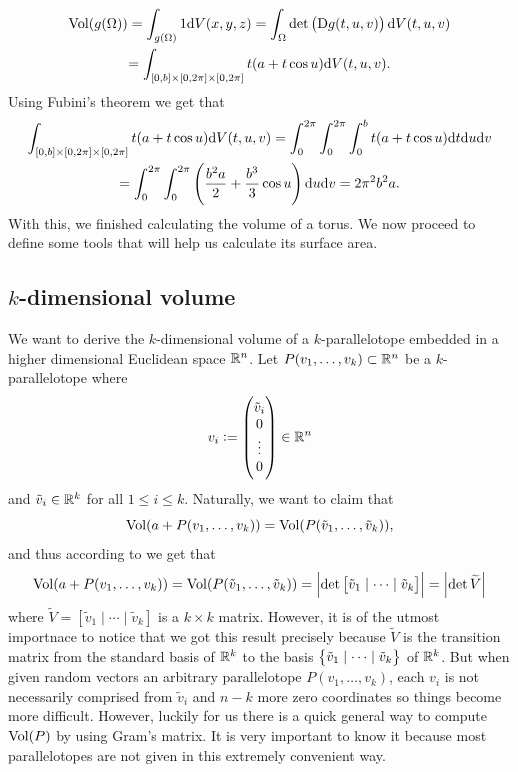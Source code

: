 \documentclass[11pt,a4paper]{article}
\begin{document}
\begin{example}
\begin{multline*}
    \Vol(g(\Omega)) =
    \int_{g(\Omega)} 1 \dV(x,y,z) =
    \int_{\Omega} \det\del{\Dif g(t,u,v)} \dV(t,u,v) \\ =
    \int_{[0,b] \times [0,2\pi] \times [0,2\pi]}
    t (a + t \cos u) \dV(t,u,v).
  \end{multline*}
  Using Fubini's theorem we get that
  \begin{multline*}
    \int_{[0,b] \times [0,2\pi] \times [0,2\pi]}
    t (a + t \cos u) \dV(t,u,v) =
    \int_{0}^{2\pi} \int_{0}^{2\pi} \int_{0}^{b}
    t (a + t \cos u) \dt\du\dv \\ =
    \int_{0}^{2\pi} \int_{0}^{2\pi}
    \del{\frac{b^2 a}{2} + \frac{b^3}{3} \cos u} \du\dv =
    2\pi^2 b^2 a.
  \end{multline*}
  With this, we finished calculating the volume of a torus.
  We now proceed to define some tools that will help us calculate its
  surface area.
\end{example}

\subsection{\texorpdfstring{$k$}{k}-dimensional volume}

\begin{remark}
  \label{rmk:volume-of-par}
  We want to derive the $k$-dimensional volume of a
  $k$-parallelotope embedded in a higher dimensional Euclidean space $\mathbb{R}^n$.
  Let $P(v_1,\dots,v_k) \subset \mathbb{R}^n$ be a $k$-parallelotope where
  \[
    v_i :=
    \begin{pmatrix} \tilde v_i \\ 0 \\ \vdots \\ 0 \end{pmatrix} \in \mathbb{R}^n
  \]
  and $\tilde v_i \in \mathbb{R}^k$ for all $1 \le i \le k$.
  Naturally, we want to claim that
  \[
    \operatorname{Vol}(a + P(v_1,\dots,v_k)) =
    \operatorname{Vol}(P(\tilde v_1,\dots,\tilde v_k)),
  \]
  and thus according to  we get that
  \[
    \operatorname{Vol}(a + P(v_1,\dots,v_k)) =
    \operatorname{Vol}(P(\tilde v_1,\dots,\tilde v_k)) =
    \left\lvert\det\left[\tilde v_1 \mid \cdots \mid \tilde v_k\right]\right\rvert =
    \left\lvert\det \widetilde V\right\rvert
  \]
  where
  $\widetilde V = \left[\tilde v_1 \mid \cdots \mid \tilde v_k\right]$
  is a $k \times k$ matrix.
  However, it is of the utmost importnace to notice that we got this
  result precisely because $\widetilde V$ is the transition matrix
  from the standard basis of $\mathbb{R}^k$ to the basis
  $\left\{\tilde v_1 \mid \cdots \mid \tilde v_k\right\}$ of $\mathbb{R}^k$.
  But when given random vectors an arbitrary parallelotope
  $P(v_1,\dots,v_k)$, each $v_i$ is not necessarily comprised
  from $\tilde v_i$ and $n - k$ more zero coordinates so things
  become more difficult.
  However, luckily for us there is a quick general
  way to compute $\operatorname{Vol}(P)$ by using Gram's matrix.
  It is very important to know it because most parallelotopes are
  not given in this extremely convenient way.
\end{remark}
\end{document}
